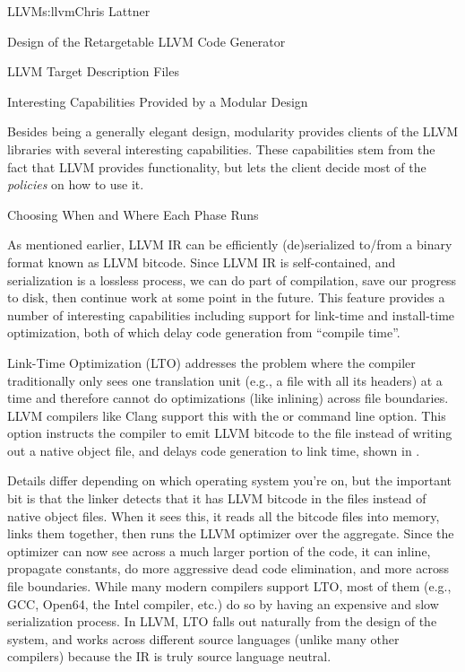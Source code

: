 \begin{aosachapter}{LLVM}{s:llvm}{Chris Lattner}
\begin{aosasect1}{Design of the Retargetable LLVM Code Generator}
\begin{aosasect2}{LLVM Target Description Files}
\end{aosasect2}

\end{aosasect1}

\begin{aosasect1}{Interesting Capabilities Provided by a Modular Design}

Besides being a generally elegant design, modularity provides clients
of the LLVM libraries with several interesting capabilities. These
capabilities stem from the fact that LLVM provides functionality, but
lets the client decide most of the \emph{policies} on how to use it.

\begin{aosasect2}{Choosing When and Where Each Phase Runs}

As mentioned earlier, LLVM IR can be efficiently (de)serialized
to/from a binary format known as LLVM bitcode.  Since LLVM IR is
self-contained, and serialization is a lossless process, we can do
part of compilation, save our progress to disk, then continue work at
some point in the future.  This feature provides a number of
interesting capabilities including support for link-time and
install-time optimization, both of which delay code generation from
``compile time''.

Link-Time Optimization (LTO) addresses the problem where the compiler
traditionally only sees one translation unit (e.g., a  file
with all its headers) at a time and therefore cannot do optimizations
(like inlining) across file boundaries.  LLVM compilers like Clang
support this with the  or  command line option.
This option instructs the compiler to emit LLVM bitcode to the
file instead of writing out a native object file, and delays
code generation to link time, shown in .


Details differ depending on which operating system you're on, but the
important bit is that the linker detects that it has LLVM bitcode in
the  files instead of native object files.  When it sees
this, it reads all the bitcode files into memory, links them together,
then runs the LLVM optimizer over the aggregate.  Since the optimizer
can now see across a much larger portion of the code, it can inline,
propagate constants, do more aggressive dead code elimination, and
more across file boundaries.  While many modern compilers support LTO,
most of them (e.g., GCC, Open64, the Intel compiler, etc.) do so by
having an expensive and slow serialization process.  In LLVM, LTO
falls out naturally from the design of the system, and works across
different source languages (unlike many other compilers) because the
IR is truly source language neutral.


\end{aosasect2}
\end{aosasect1}
\end{aosachapter}

